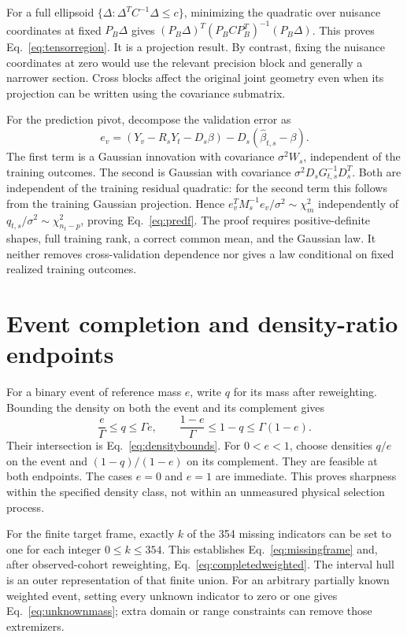 For a full ellipsoid $\{\Delta:\Delta^TC^{-1}\Delta\leq c\}$, minimizing the quadratic over nuisance coordinates at fixed $P_B\Delta$ gives $(P_B\Delta)^T(P_BCP_B^T)^{-1}(P_B\Delta)$. This proves Eq.~\eqref{eq:tensorregion}. It is a projection result. By contrast, fixing the nuisance coordinates at zero would use the relevant precision block and generally a narrower section. Cross blocks affect the original joint geometry even when its projection can be written using the covariance submatrix.

For the prediction pivot, decompose the validation error as
\begin{equation}
 e_v=\left(Y_v-R_sY_t-D_s\beta\right)
                         -D_s(\widehat\beta_{t,s}-\beta).
\end{equation}
The first term is a Gaussian innovation with covariance $\sigma^2W_s$, independent of the training outcomes. The second is Gaussian with covariance $\sigma^2D_sG_{t,s}^{-1}D_s^T$. Both are independent of the training residual quadratic: for the second term this follows from the training Gaussian projection. Hence $e_v^TM_s^{-1}e_v/\sigma^2\sim\chi^2_m$ independently of $q_{t,s}/\sigma^2\sim\chi^2_{n_t-p}$, proving Eq.~\eqref{eq:predf}. The proof requires positive-definite shapes, full training rank, a correct common mean, and the Gaussian law. It neither removes cross-validation dependence nor gives a law conditional on fixed realized training outcomes.

\section{Event completion and density-ratio endpoints}
\label{app:completion}

For a binary event of reference mass $e$, write $q$ for its mass after reweighting. Bounding the density on both the event and its complement gives
\begin{equation}
 \frac e\Gamma\leq q\leq\Gamma e,\qquad
 \frac{1-e}{\Gamma}\leq1-q\leq\Gamma(1-e).
\end{equation}
Their intersection is Eq.~\eqref{eq:densitybounds}. For $0<e<1$, choose densities $q/e$ on the event and $(1-q)/(1-e)$ on its complement. They are feasible at both endpoints. The cases $e=0$ and $e=1$ are immediate. This proves sharpness within the specified density class, not within an unmeasured physical selection process.

For the finite target frame, exactly $k$ of the 354 missing indicators can be set to one for each integer $0\leq k\leq354$. This establishes Eq.~\eqref{eq:missingframe} and, after observed-cohort reweighting, Eq.~\eqref{eq:completedweighted}. The interval hull is an outer representation of that finite union. For an arbitrary partially known weighted event, setting every unknown indicator to zero or one gives Eq.~\eqref{eq:unknownmass}; extra domain or range constraints can remove those extremizers.

